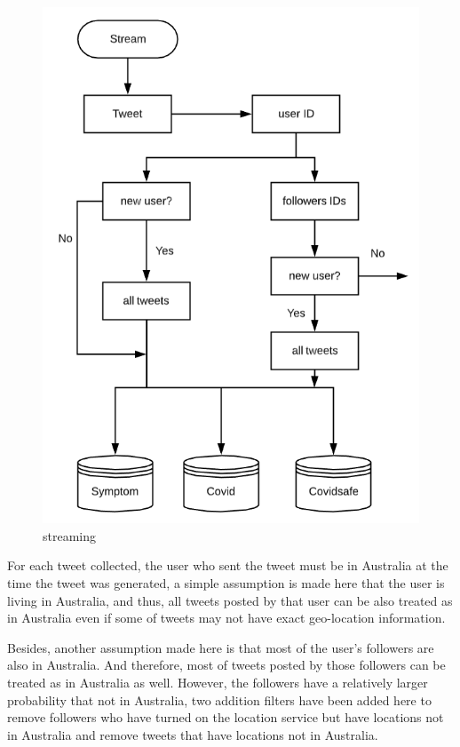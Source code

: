 \begin{figure}[H]
\centering
\includegraphics[scale=0.4]{city_analytics/report/images/stream.png}
\caption{streaming}
\label{fig:stream}
\end{figure}


For each tweet collected, the user who sent the tweet must be in Australia at the time the tweet was generated, a simple assumption is made here that the user is living in Australia, and thus, all tweets posted by that user can be also treated as in Australia even if some of tweets may not have exact geo-location information. 

Besides, another assumption made here is that most of the user's followers are also in Australia. And therefore, most of tweets posted by those followers can be treated as in Australia as well. However, the followers have a relatively larger probability that not in Australia, two addition filters have been added here to remove followers who have turned on the location service but have locations not in Australia and remove tweets that have locations not in Australia.

